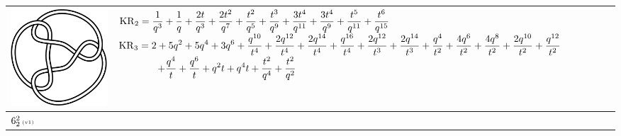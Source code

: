 \documentclass{compositio}
\theoremstyle{definition}
\numberwithin{equation}{section}
\begin{document}
{\begin{longtable}{p{}|p{}}
\includegraphics[scale=0.07,angle=0]{link6_1_3.pdf} 
& 
\newline 
$
\displaystyle{%
\KR_{2} = \frac{1}{q^3}+\frac{1}{q}+\frac{2 t}{q^3}+\frac{2 t^2}{q^7}+\frac{t^2}{q^5}+\frac{t^3}{q^9}+\frac{3 t^4}{q^{11}}+\frac{3 t^4}{q^9}+\frac{t^5}{q^{11}}+\frac{t^6}{q^{15}}
}
$
\newline 
$
\displaystyle{%
\KR_{3} = 2+5 q^2+5 q^4+3 q^6+\frac{q^{10}}{t^4}+\frac{2 q^{12}}{t^4}+\frac{2 q^{14}}{t^4}+\frac{q^{16}}{t^4}+\frac{2 q^{12}}{t^3}+\frac{2 q^{14}}{t^3}+\frac{q^4}{t^2}+\frac{4 q^6}{t^2}+\frac{4 q^8}{t^2}+\frac{2 q^{10}}{t^2}+\frac{q^{12}}{t^2}
}
$
\newline
$
\displaystyle{%
\qquad\qquad +\frac{q^4}{t}+\frac{q^6}{t}+q^2 t+q^4 t+\frac{t^2}{q^4}+\frac{t^2}{q^2}
}
$
\newline 
\\
\hline
$6_{2}^2\,\text{{\tiny (v1)}}$ 

\end{longtable}}
\end{document}
